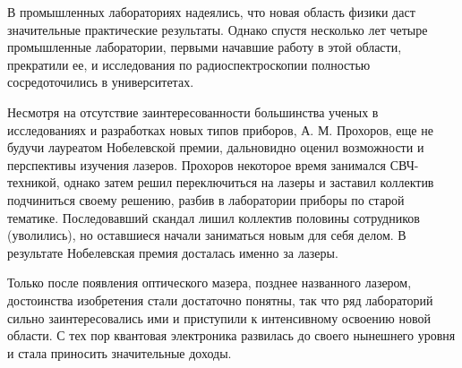 В промышленных лабораториях надеялись, что новая область физики даст 
значительные практические результаты. Однако спустя несколько лет четыре 
промышленные лаборатории, первыми начавшие работу в этой области, прекратили 
ее, и исследования по радиоспектроскопии полностью сосредоточились в 
университетах.

Несмотря на отсутствие заинтересованности большинства ученых в исследованиях и 
разработках новых типов приборов, А. М. Прохоров, еще не будучи лауреатом 
Нобелевской премии, дальновидно оценил возможности и перспективы изучения 
лазеров. Прохоров некоторое время занимался СВЧ-техникой, однако затем решил 
переключиться на лазеры и заставил коллектив подчиниться своему решению, разбив 
в лаборатории приборы по старой тематике. Последовавший скандал лишил коллектив 
половины сотрудников (уволились), но оставшиеся начали заниматься новым для 
себя делом. В результате Нобелевская премия досталась именно за лазеры.

Только после появления оптического мазера, позднее названного лазером, 
достоинства изобретения стали достаточно понятны, так что ряд лабораторий 
сильно заинтересовались ими и приступили к интенсивному освоению новой области. 
С тех пор квантовая электроника развилась до своего нынешнего уровня и стала 
приносить значительные доходы.